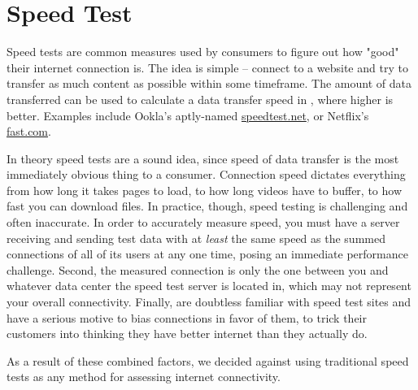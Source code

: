 \section{Speed Test}\label{sec:speed_test_background}

Speed tests are common measures used by consumers to figure out how "good" their internet connection is. The idea is simple -- connect to a website and try to transfer as much content as possible within some timeframe. The amount of data transferred can be used to calculate a data transfer speed in \Mbps, where higher is better. Examples include Ookla's aptly-named \url{speedtest.net}, or Netflix's \url{fast.com}.

In theory speed tests are a sound idea, since speed of data transfer is the most immediately obvious thing to a consumer. Connection speed dictates everything from how long it takes pages to load, to how long videos have to buffer, to how fast you can download files. In practice, though, speed testing is challenging and often inaccurate. In order to accurately measure speed, you must have a server receiving and sending test data with at \textit{least} the same speed as the summed connections of all of its users at any one time, posing an immediate performance challenge. Second, the measured connection is only the one between you and whatever data center the speed test server is located in, which may not represent your overall connectivity. Finally, \isps are doubtless familiar with speed test sites and have a serious motive to bias connections in favor of them, to trick their customers into thinking they have better internet than they actually do.

As a result of these combined factors, we decided against using traditional speed tests as any method for assessing internet connectivity.
